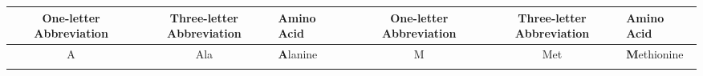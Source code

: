 \documentclass[12pt,a4paper,twoside]{book}
\theoremstyle{definition}
\theoremstyle{definition}
\theoremstyle{remark}
\begin{document}
\begin{longtable}[]{@{}ccllccl@{}}
\toprule
\begin{minipage}[b]{0.14\columnwidth}\centering\strut
One-letter Abbreviation\strut
\end{minipage} & \begin{minipage}[b]{0.13\columnwidth}\centering\strut
Three-letter Abbreviation\strut
\end{minipage} & \begin{minipage}[b]{0.13\columnwidth}\raggedright\strut
Amino Acid\strut
\end{minipage} & \begin{minipage}[b]{0.02\columnwidth}\raggedright\strut
\strut
\end{minipage} & \begin{minipage}[b]{0.13\columnwidth}\centering\strut
One-letter Abbreviation\strut
\end{minipage} & \begin{minipage}[b]{0.13\columnwidth}\centering\strut
Three-letter Abbreviation\strut
\end{minipage} & \begin{minipage}[b]{0.12\columnwidth}\raggedright\strut
Amino Acid\strut
\end{minipage}\tabularnewline
\midrule
\endhead
\begin{minipage}[t]{0.14\columnwidth}\centering\strut
A\strut
\end{minipage} & \begin{minipage}[t]{0.13\columnwidth}\centering\strut
Ala\strut
\end{minipage} & \begin{minipage}[t]{0.13\columnwidth}\raggedright\strut
\textbf{A}lanine\strut
\end{minipage} & \begin{minipage}[t]{0.02\columnwidth}\raggedright\strut
\strut
\end{minipage} & \begin{minipage}[t]{0.13\columnwidth}\centering\strut
M\strut
\end{minipage} & \begin{minipage}[t]{0.13\columnwidth}\centering\strut
Met\strut
\end{minipage} & \begin{minipage}[t]{0.12\columnwidth}\raggedright\strut
\textbf{M}ethionine\strut
\end{minipage}\tabularnewline
\begin{minipage}[t]{0.14\columnwidth}\centering\strut

\end{minipage}
\end{longtable}
\end{document}
